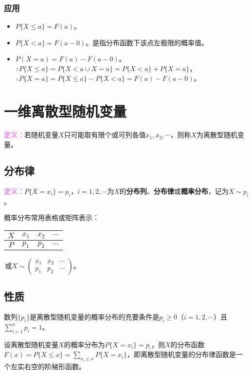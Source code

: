 \documentclass[UTF8, 12pt]{ctexart}
\begin{document}
\subsubsection{应用}

\begin{itemize}
    \item $P\{X\leqslant a\}=F(a)$。
    \item $P\{X<a\}=F(a-0)$。是指分布函数下该点左极限的概率值。
    \item $P(X=a)=F(a)-F(a-0)$。$\because P\{X\leqslant a\}=P\{X<a\cup X=a\}=P\{X<a\}+P\{X=a\}$，$\therefore P\{X=a\}=P\{X\leqslant a\}-P\{X<a\}=F(a)-F(a-0)$。
\end{itemize}

\section{一维离散型随机变量}

\textcolor{violet}{\textbf{定义：}}若随机变量$X$只可能取有限个或可列各值$x_1,x_2,\cdots$，则称$X$为离散型随机变量。

\subsection{分布律}

\textcolor{violet}{\textbf{定义：}}$P\{X=x_i\}=p_i$，$i=1,2,\cdots$为$X$的\textbf{分布列}、\textbf{分布律}或\textbf{概率分布}，记为$X\sim p_i$。

概率分布常用表格或矩阵表示：\medskip

\begin{tabular}{c|ccc}
    \hline
    $X$ & $x_1$ & $x_2$ & $\cdots$ \\ \hline
    $P$ & $p_1$ & $p_2$ & $\cdots$ \\
    \hline
\end{tabular}\,或$X\sim\left(\begin{array}{ccc}
    x_1 & x_2 & \cdots \\
    p_1 & p_2 & \cdots
\end{array}\right)$。\medskip

\subsection{性质}

数列$\{p_i\}$是离散型随机变量的概率分布的充要条件是$p_i\geqslant0$（$i=1,2,\cdots$）且$\sum\limits_{i=1}^np_i=1$。

设离散型随机变量$X$的概率分布为$P\{X=x_i\}=p_i$，则$X$的分布函数$F(x)=P\{X\leqslant x\}=\sum\limits_{x_i\leqslant x}P\{X=x_i\}$，即离散型随机变量的分布律函数是一个左实右空的阶梯形函数。
\end{document}
